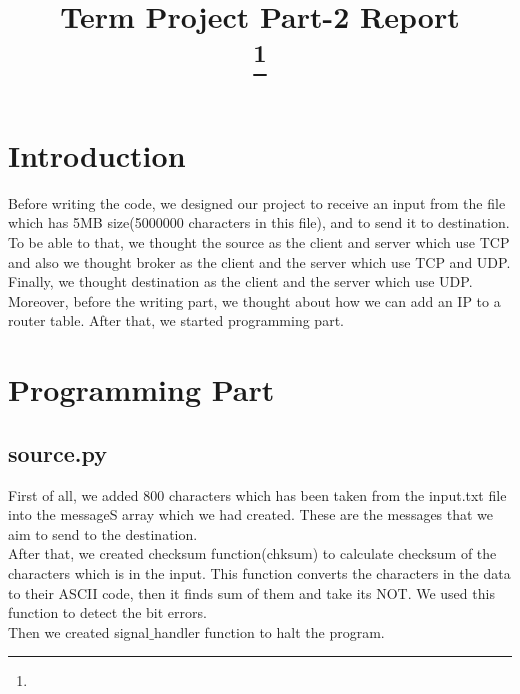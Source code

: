 \documentclass[conference]{IEEEtran}
\begin{document}
\title{Term Project Part-2 Report\\
{\footnotesize \textsuperscript{}}
\thanks{}
}

\author{

}

\maketitle


\section{Introduction}
Before writing the code, we designed our project to receive an input from the file which has 5MB size(5000000 characters in this file), and to send it to destination. To be able to that, we thought the source as the client and server which use TCP and also we thought broker as the client and the server which use TCP and UDP. Finally, we thought destination as the client and the server which use UDP. Moreover, before the writing part, we thought about how we can add an IP to a router table. After that, we started programming part.

\section{Programming Part}

\subsection{source.py}
First of all, we added 800 characters which has been taken from the input.txt file into the messageS array which we had created. These are the messages that we aim to send to the destination.\\

After that, we created checksum function(chksum) to calculate checksum of the characters which is in the input. This function converts the characters in the data to their ASCII code, then it finds sum of them and take its NOT. We used this function to detect the bit errors.\\

Then we created signal$\_$handler function to halt the program.\\
\end{document}
